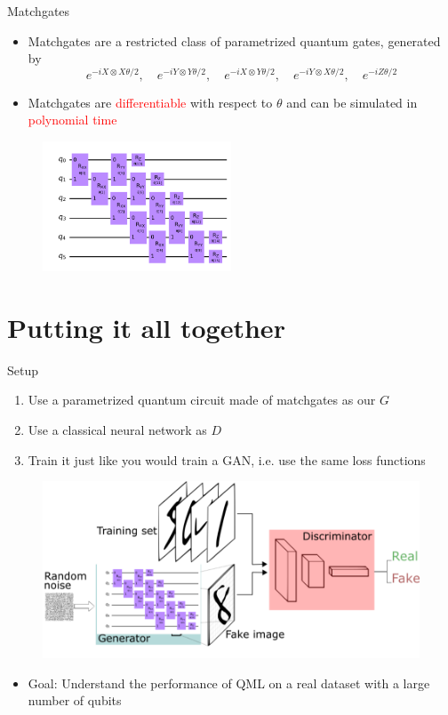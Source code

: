 \documentclass[xcolor=dvipsnames]{beamer}
\begin{document}
\begin{frame}{Matchgates}
  \begin{itemize}
    \item Matchgates are a restricted class of parametrized quantum gates, generated by 
    $$e^{-iX\otimes X\theta/2},\quad e^{-iY\otimes Y\theta/2},\quad e^{-iX\otimes Y\theta/2},\quad e^{-iY\otimes X\theta/2},\quad e^{-iZ\theta/2}$$
    \item Matchgates are \textcolor{red}{differentiable} with respect to $\theta$ and can be simulated in \textcolor{red}{polynomial time} 
  \end{itemize}

  \begin{figure}
    \centering
    \includegraphics[width=0.5\textwidth]{output.png}
  \end{figure}

\end{frame}

\section{Putting it all together}

\begin{frame}{Setup}
  \begin{enumerate}
    \item Use a parametrized quantum circuit made of matchgates as our $G$
    \item Use a classical neural network as $D$
    \item Train it just like you would train a GAN, i.e. use the same loss functions
  \end{enumerate}
  \begin{figure}
    \centering
    \includegraphics[width=0.7 \textwidth]{setup.png}
  \end{figure}
  \begin{itemize}
    \item Goal: Understand the performance of QML on a real dataset with a large number of qubits
  \end{itemize}
\end{frame}
\end{document}
